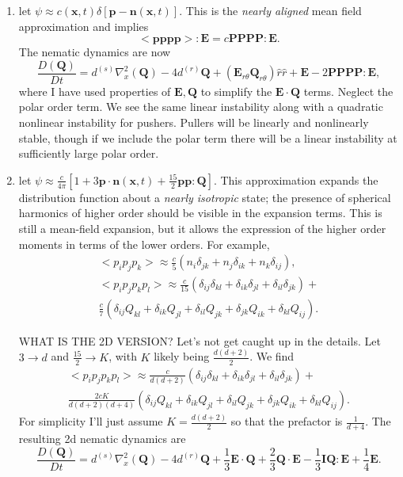 \documentclass[onecolumn,showpacs,preprintnumbers,prl,amsmath,amssymb]{revtex4-1}
\def\b{\mathbf}
\begin{document}
\begin{enumerate}\label{eq:closures}
\item let $\psi\approx c(\b{x},t)\delta\left[\b{p}-\b{n}(\b{x},t)\right]$. This is the {\it nearly aligned} mean field approximation and implies
\begin{equation}
<\b{pppp}>:\b{E}=c\b{PPPP:E}.
\end{equation}
The nematic dynamics are now
\begin{equation}
\frac{D(\b{Q})}{Dt}=d^{(s)}\nabla_x^2(\b{Q})-4d^{(r)}\b{Q}+(\b{E}_{r\theta}\b{Q}_{r\theta})\hat{r}\hat{r}+\b{E}-2 \b{PPPP:E},
\end{equation}
where I have used properties of $\b{E},\b{Q}$ to simplify the $\b{E\cdot Q}$ terms.  Neglect the polar order term.  We see the same linear instability along with a quadratic nonlinear instability for pushers.  Pullers will be linearly and nonlinearly stable, though if we include the polar term there will be a linear instability at sufficiently large polar order.  

\item let $\psi\approx\frac{c}{4\pi}\left[1+3\b{p}\cdot\b{n}(\b{x},t)+\frac{15}{2}\b{pp:Q}\right]$. This approximation expands the distribution function about a {\it nearly isotropic} state; the presence of spherical harmonics of higher order should be visible in the expansion terms. This is still a mean-field expansion, but it allows the expression of the higher order moments in terms of the lower orders. For example,
\begin{gather}
<p_ip_jp_k>\approx\frac{c}{5}(n_i\delta_{jk}+n_j\delta_{ik}+n_k\delta_{ij}),\\
<p_ip_jp_kp_l>\approx\frac{c}{15}(\delta_{ij}\delta_{kl}+\delta_{ik}\delta_{jl}+\delta_{il}\delta_{jk})+\\
\nonumber \frac{c}{7}(\delta_{ij}Q_{kl}+\delta_{ik}Q_{jl}+\delta_{il}Q_{jk}+\delta_{jk}Q_{ik}+\delta_{kl}Q_{ij}).
\end{gather}

WHAT IS THE 2D VERSION?  Let's not get caught up in the details.  Let $3\rightarrow d$ and $\frac{15}{2}\rightarrow K$, with $K$ likely being $\frac{d(d+2)}{2}$.  We find
\begin{gather}
<p_ip_jp_kp_l>\approx\frac{c}{d(d+2)}(\delta_{ij}\delta_{kl}+\delta_{ik}\delta_{jl}+\delta_{il}\delta_{jk})+\\
\nonumber \frac{2 c K}{d(d+2)(d+4)}(\delta_{ij}Q_{kl}+\delta_{ik}Q_{jl}+\delta_{il}Q_{jk}+\delta_{jk}Q_{ik}+\delta_{kl}Q_{ij}).
\end{gather}
For simplicity I'll just assume $K=\frac{d(d+2)}{2}$ so that the prefactor is $\frac{1}{d+4}$.  The resulting 2d nematic dynamics are
\begin{equation}
\frac{D(\b{Q})}{Dt}=d^{(s)}\nabla_x^2(\b{Q})-4d^{(r)}\b{Q}+\frac{1}{3}\b{E\cdot Q}+\frac{2}{3}\b{Q\cdot E}-\frac{1}{3}\b{I Q:E}+\frac{1}{4}\b{E}.
\end{equation}


\end{enumerate}
\end{document}
